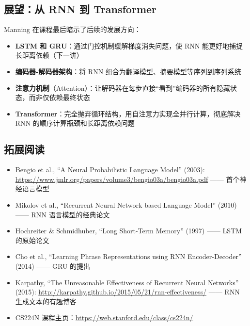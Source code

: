\documentclass[a4paper]{article}
\begin{document}
\subsection{展望：从 RNN 到 Transformer}

Manning 在课程最后暗示了后续的发展方向：

\begin{itemize}
    \item \textbf{LSTM 和 GRU}：通过门控机制缓解梯度消失问题，使 RNN 能更好地捕捉长距离依赖（下一讲）
    \item \textbf{编码器-解码器架构}：将 RNN 组合为翻译模型、摘要模型等序列到序列系统
    \item \textbf{注意力机制}（Attention）：让解码器在每步直接``看到''编码器的所有隐藏状态，而非仅依赖最终状态
    \item \textbf{Transformer}：完全抛弃循环结构，用自注意力实现全并行计算，彻底解决 RNN 的顺序计算瓶颈和长距离依赖问题
\end{itemize}

\subsection{拓展阅读}

\begin{itemize}
    \item Bengio et al., ``A Neural Probabilistic Language Model'' (2003): \url{https://www.jmlr.org/papers/volume3/bengio03a/bengio03a.pdf} —— 首个神经语言模型
    \item Mikolov et al., ``Recurrent Neural Network based Language Model'' (2010) —— RNN 语言模型的经典论文
    \item Hochreiter \& Schmidhuber, ``Long Short-Term Memory'' (1997) —— LSTM 的原始论文
    \item Cho et al., ``Learning Phrase Representations using RNN Encoder-Decoder'' (2014) —— GRU 的提出
    \item Karpathy, ``The Unreasonable Effectiveness of Recurrent Neural Networks'' (2015): \url{http://karpathy.github.io/2015/05/21/rnn-effectiveness/} —— RNN 生成文本的有趣博客
    \item CS224N 课程主页：\url{https://web.stanford.edu/class/cs224n/}
\end{itemize}
\end{document}
